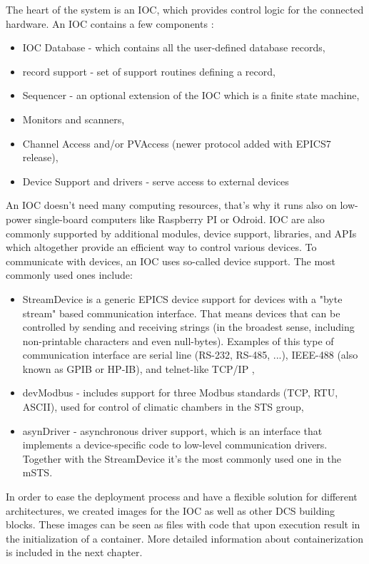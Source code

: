 The heart of the system is an \gls{IOC}, which provides control logic for the connected hardware. An \gls{IOC} contains a few components \cite{IOC}:
\begin{itemize}
    \item \gls{IOC} Database - which contains all the user-defined database  records,
    \item record support - set of support routines defining a record,
    \item Sequencer - an optional extension of the \gls{IOC} which is a finite state machine,
    \item Monitors and scanners,
    \item Channel Access and/or PVAccess (newer protocol added with EPICS7 release),
    \item Device Support and drivers - serve access to external devices
\end{itemize}
An \gls{IOC} doesn't need many computing resources, that's why it runs also on low-power single-board computers like Raspberry PI or Odroid. 
 \gls{IOC} are also commonly supported by additional modules, device support, libraries, and \glspl{API} which altogether provide an efficient way to control various devices.
To communicate with devices, an \gls{IOC} uses so-called device support. The most commonly used ones include:
\begin{itemize}
    \item StreamDevice is a generic EPICS device support for devices with a "byte stream" based communication interface. That means devices that can be controlled by sending and receiving strings (in the broadest sense, including non-printable characters and even null-bytes). Examples of this type of communication interface are serial line (RS-232, RS-485, ...), IEEE-488 (also known as GPIB or HP-IB), and telnet-like TCP/IP \cite{StreamDevice},
    \item devModbus \cite{modbus} - includes support for three Modbus standards (TCP, RTU, ASCII), used for control of climatic chambers in the \gls{STS} group,
    \item asynDriver \cite{asyn} - asynchronous driver support, which is an interface that implements a device-specific code to low-level communication drivers. Together with the StreamDevice it's the most commonly used one in the \gls{mSTS}. 
\end{itemize}

In order to ease the deployment process and have a flexible solution for different architectures, we created images for the \gls{IOC} as well as other \gls{DCS} building blocks. These images can be seen as files with code that upon execution result in the initialization of a container. More detailed information about containerization is included in the next chapter. 
 
